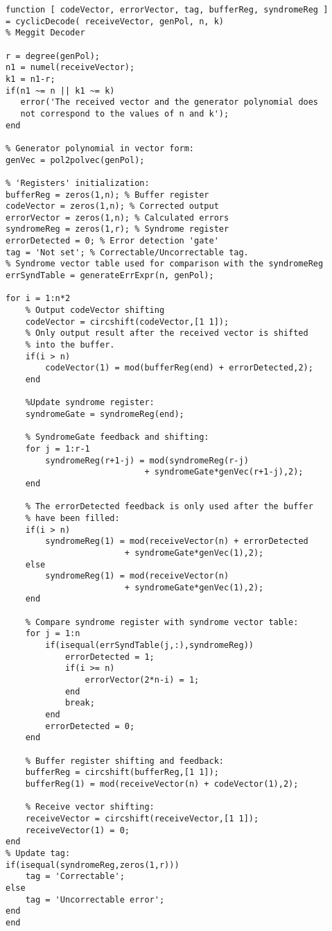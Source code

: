 \documentclass[MiniProjectMain]{subfiles}
\begin{document}
\begin{lstlisting}[caption=Cyclic Meggit decoding]
function [ codeVector, errorVector, tag, bufferReg, syndromeReg ] 
= cyclicDecode( receiveVector, genPol, n, k)
% Meggit Decoder

r = degree(genPol);
n1 = numel(receiveVector);
k1 = n1-r;
if(n1 ~= n || k1 ~= k)
   error('The received vector and the generator polynomial does 
   not correspond to the values of n and k'); 
end

% Generator polynomial in vector form:
genVec = pol2polvec(genPol);

% 'Registers' initialization:
bufferReg = zeros(1,n); % Buffer register
codeVector = zeros(1,n); % Corrected output
errorVector = zeros(1,n); % Calculated errors
syndromeReg = zeros(1,r); % Syndrome register
errorDetected = 0; % Error detection 'gate'
tag = 'Not set'; % Correctable/Uncorrectable tag.
% Syndrome vector table used for comparison with the syndromeReg
errSyndTable = generateErrExpr(n, genPol);

for i = 1:n*2
    % Output codeVector shifting
    codeVector = circshift(codeVector,[1 1]);
    % Only output result after the received vector is shifted 
   	% into the buffer.
    if(i > n)
        codeVector(1) = mod(bufferReg(end) + errorDetected,2);
    end

    %Update syndrome register:
    syndromeGate = syndromeReg(end);

    % SyndromeGate feedback and shifting:
    for j = 1:r-1
        syndromeReg(r+1-j) = mod(syndromeReg(r-j) 
        					+ syndromeGate*genVec(r+1-j),2);
    end
    
    % The errorDetected feedback is only used after the buffer 
    % have been filled:
    if(i > n)
        syndromeReg(1) = mod(receiveVector(n) + errorDetected 
        				+ syndromeGate*genVec(1),2);
    else
        syndromeReg(1) = mod(receiveVector(n) 
        				+ syndromeGate*genVec(1),2);
    end
    
    % Compare syndrome register with syndrome vector table:
    for j = 1:n
        if(isequal(errSyndTable(j,:),syndromeReg))
            errorDetected = 1;
            if(i >= n)
                errorVector(2*n-i) = 1;
            end
            break;
        end
        errorDetected = 0;
    end

    % Buffer register shifting and feedback:
    bufferReg = circshift(bufferReg,[1 1]);
    bufferReg(1) = mod(receiveVector(n) + codeVector(1),2);
    
    % Receive vector shifting:
    receiveVector = circshift(receiveVector,[1 1]);
    receiveVector(1) = 0;
end
% Update tag:
if(isequal(syndromeReg,zeros(1,r)))
    tag = 'Correctable';
else
    tag = 'Uncorrectable error';
end
end
\end{lstlisting}
\end{document}
